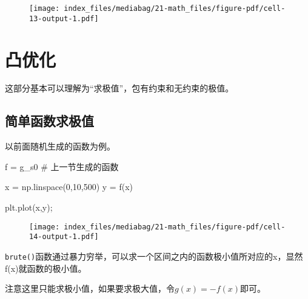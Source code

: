\documentclass[
  letterpaper,
  DIV=11,
  numbers=noendperiod]{scrreprt}
\newenvironment{Shaded}{\begin{snugshade}}{\end{snugshade}}
\newcommand{\CommentTok}[1]{\textcolor[rgb]{0.37,0.37,0.37}{#1}}
\newcommand{\DecValTok}[1]{\textcolor[rgb]{0.68,0.00,0.00}{#1}}
\newcommand{\NormalTok}[1]{\textcolor[rgb]{0.00,0.23,0.31}{#1}}
\newcommand{\OperatorTok}[1]{\textcolor[rgb]{0.37,0.37,0.37}{#1}}
\begin{document}
\begin{figure}[H]

{\centering \texttt{[image: index\_files/mediabag/21-math\_files/figure-pdf/cell-13-output-1.pdf]}

}

\end{figure}

\hypertarget{ux51f8ux4f18ux5316}{%
\section{凸优化}\label{ux51f8ux4f18ux5316}}

这部分基本可以理解为``求极值''，包有约束和无约束的极值。

\hypertarget{ux7b80ux5355ux51fdux6570ux6c42ux6781ux503c}{%
\subsection{简单函数求极值}\label{ux7b80ux5355ux51fdux6570ux6c42ux6781ux503c}}

以前面随机生成的函数为例。

\begin{Shaded}
\begin{Highlighting}[]
\NormalTok{f }\OperatorTok{=}\NormalTok{ g\_s0 }\CommentTok{\# 上一节生成的函数}

\NormalTok{x }\OperatorTok{=}\NormalTok{ np.linspace(}\DecValTok{0}\NormalTok{,}\DecValTok{10}\NormalTok{,}\DecValTok{500}\NormalTok{)}
\NormalTok{y }\OperatorTok{=}\NormalTok{ f(x)}

\NormalTok{plt.plot(x,y)}\OperatorTok{;}
\end{Highlighting}
\end{Shaded}

\begin{figure}[H]

{\centering \texttt{[image: index\_files/mediabag/21-math\_files/figure-pdf/cell-14-output-1.pdf]}

}

\end{figure}

\texttt{brute()}函数通过暴力穷举，可以求一个区间之内的函数极小值所对应的x，显然f(x)就函数的极小值。

注意这里只能求极小值，如果要求极大值，令\(g(x) = -f(x)\)即可。
\end{document}
